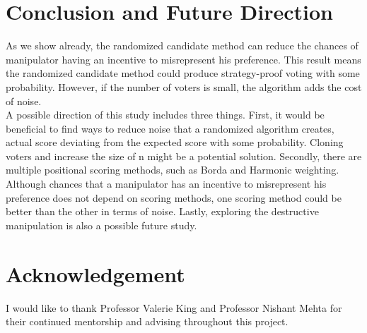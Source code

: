 \documentclass[letterpaper]{article} %
\begin{document}
\section{Conclusion and Future Direction}
As we show already, the randomized candidate method can reduce the chances of manipulator having an incentive to misrepresent his preference. This result means the randomized candidate method could produce strategy-proof voting with some probability. However, if the number of voters is small, the algorithm adds the cost of noise.\\
A possible direction of this study includes three things. First, it would be beneficial to find ways to reduce noise that a randomized algorithm creates, actual score deviating from the expected score with some probability. Cloning voters and increase the size of n might be a potential solution.
Secondly, there are multiple positional scoring methods, such as Borda and Harmonic weighting. Although chances that a manipulator has an incentive to misrepresent his preference does not depend on scoring methods, one scoring method could be better than the other in terms of noise. Lastly, exploring the destructive manipulation is also a possible future study.


\section{Acknowledgement}
I would like to thank Professor Valerie King and Professor Nishant Mehta for their continued mentorship and advising throughout this project.




\end{document}
